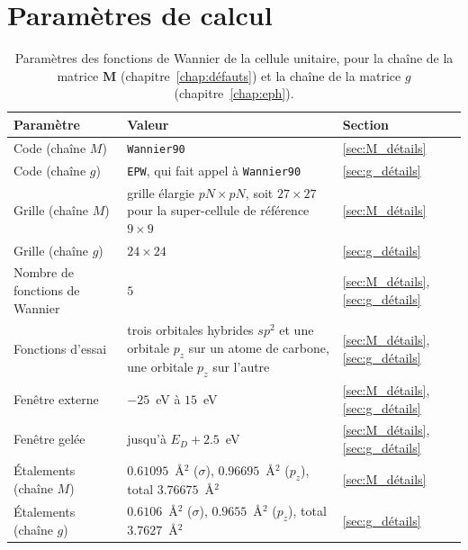 \section{Paramètres de calcul}\label{sec:annexe_param_M}
\vspace*{\fill}
\begin{table}[htbp]
    \centering
    \caption[Paramètres des fonctions de Wannier.]{Paramètres des fonctions de Wannier de la cellule unitaire, pour la chaîne de la matrice $\bm M$ (chapitre~\ref{chap:défauts}) et la chaîne de la matrice $g$ (chapitre~\ref{chap:eph}).}
    \label{tab:param_wannier}
    \small
    \setlength{\tabcolsep}{4pt}
    \begin{tabular}{p{} p{} p{}}
        \hline\hline
        Paramètre & Valeur & Section \\
        \hline
        Code (chaîne $M$) & \texttt{Wannier90} & \ref{sec:M_détails} \\
        Code (chaîne $g$) & \texttt{EPW}, qui fait appel à \texttt{Wannier90} & \ref{sec:g_détails} \\
        Grille (chaîne $M$) & grille élargie $pN\times pN$, soit $27\times 27$ pour la super-cellule de référence $9\times 9$ & \ref{sec:M_détails} \\
        Grille (chaîne $g$) & $24\times 24$ & \ref{sec:g_détails} \\
        Nombre de fonctions de Wannier & $5$ & \ref{sec:M_détails}, \ref{sec:g_détails} \\
        Fonctions d'essai & trois orbitales hybrides $sp^2$ et une orbitale $p_z$ sur un atome de carbone, une orbitale $p_z$ sur l'autre & \ref{sec:M_détails}, \ref{sec:g_détails} \\
        Fenêtre externe & $-25$~eV à $15$~eV & \ref{sec:M_détails}, \ref{sec:g_détails} \\
        Fenêtre gelée & jusqu'à $E_D + 2.5$~eV & \ref{sec:M_détails}, \ref{sec:g_détails} \\
        Étalements (chaîne $M$) & $0.61095$~\AA$^2$ ($\sigma$), $0.96695$~\AA$^2$ ($p_z$), total $3.76675$~\AA$^2$ & \ref{sec:M_détails} \\
        Étalements (chaîne $g$) & $0.6106$~\AA$^2$ ($\sigma$), $0.9655$~\AA$^2$ ($p_z$), total $3.7627$~\AA$^2$ & \ref{sec:g_détails} \\
        \hline\hline
    \end{tabular}
\end{table}
\vspace*{\fill}
